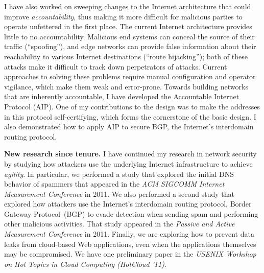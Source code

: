 I have also worked on sweeping changes to the Internet architecture that
could improve {\em accountability}, thus making it more difficult for
malicious parties to operate unfettered in the first place.  The current
Internet architecture provides little to no accountability. Malicious
end systems can conceal the source of their traffic (``spoofing''), and
edge networks can provide false information about their reachability to
various Internet destinations (``route hijacking''); both of these
attacks make it difficult to track down perpetrators of attacks.
Current approaches to solving these problems require manual
configuration and operator vigilance, which make them weak and
error-prone.  Towards building networks that are inherently accountable,
I have developed the Accountable Internet Protocol (AIP).  One of my
contributions to the design was to make the addresses in this protocol
self-certifying, which forms the cornerstone of the basic design.  I
also demonstrated how to apply AIP to secure BGP, the Internet's
interdomain routing protocol.

{\bf New research since tenure.} I have continued my research in network
security by studying how attackers use the underlying Internet
infrastructure to achieve {\em agility}.  In particular, we performed a
study that explored the initial DNS behavior of spammers that appeared
in the {\em ACM SIGCOMM Internet Measurement Conference} in 2011. We
also performed a second study that explored how attackers use the
Internet's interdomain routing protocol, Border Gateway Protocol~(BGP)
to evade detection when sending spam and performing other malicious
activities.  That study appeared in the {\em Passive and Active
Measurement Conference} in 2011.  Finally, we are exploring how to
prevent data leaks from cloud-based Web applications, even when the
applications themselves may be compromised.  We have one preliminary
paper in the {\em USENIX Workshop on Hot Topics in Cloud Computing
(HotCloud '11)}.


